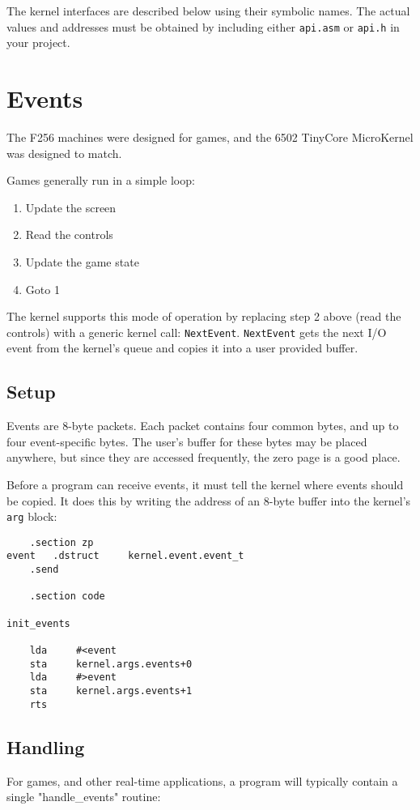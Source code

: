 The kernel interfaces are described below using their symbolic names.  The actual values and addresses must be obtained by including either \verb+api.asm+ or \verb+api.h+ in your project.

\section*{Events}

The F256 machines were designed for games, and the 6502 TinyCore MicroKernel was designed to match.

Games generally run in a simple loop:

\begin{enumerate}
    \item Update the screen
    \item Read the controls
    \item Update the game state
    \item Goto 1
\end{enumerate}

The kernel supports this mode of operation by replacing step 2 above (read the controls) with a generic kernel call: \verb+NextEvent+.  \verb+NextEvent+ gets the next I/O event from the kernel's queue and copies it into a user provided buffer.  

\subsection*{Setup}

Events are 8-byte packets.  Each packet contains four common bytes, and up to four event-specific bytes.  The user's buffer for these bytes may be placed anywhere, but since they are accessed frequently, the zero page is a good place.

Before a program can receive events, it must tell the kernel where events should be copied.  It does this by writing the address of an 8-byte buffer into the kernel's \verb+arg+ block:

\begin{verbatim}
    .section zp
event   .dstruct	 kernel.event.event_t
    .send

    .section code

init_events

    lda     #<event
    sta     kernel.args.events+0
    lda     #>event
    sta     kernel.args.events+1
    rts
\end{verbatim}

\subsection*{Handling}
For games, and other real-time applications, a program will typically contain a single "handle\_events" routine:


